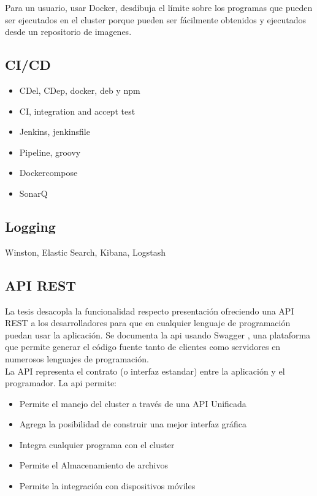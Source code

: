 Para un usuario, usar Docker, desdibuja el límite sobre los programas que pueden ser ejecutados en el cluster porque pueden ser fácilmente obtenidos y ejecutados desde un repositorio de imagenes.\\


\subsection{CI/CD}
\begin{itemize}
\item CDel, CDep, docker, deb y npm
\item CI, integration and accept test
\item Jenkins, jenkinsfile
\item Pipeline, groovy
\item Dockercompose
\item SonarQ
\end{itemize}

\subsection{Logging}
Winston, Elastic Search, Kibana, Logstash

\subsection{API REST}
La tesis desacopla la funcionalidad respecto presentación ofreciendo una API REST a los desarrolladores para que en cualquier lenguaje de programación puedan usar la aplicación. Se documenta la api usando Swagger \cite{Swagger}, una plataforma que permite generar el código fuente tanto de clientes como servidores en numerosos lenguajes de programación. \\

La API representa el contrato (o interfaz estandar) entre la aplicación y el programador. La api permite:

\begin{itemize}
\item Permite el manejo del cluster a través de una API Unificada
\item Agrega la posibilidad de construir una mejor interfaz gráfica
\item Integra cualquier programa con el cluster
\item Permite el Almacenamiento de archivos
\item Permite la integración con dispositivos móviles
\end{itemize}

